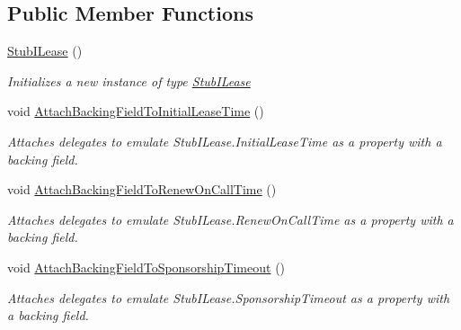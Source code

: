 \subsection*{Public Member Functions}
\begin{DoxyCompactItemize}
\item 
\hyperlink{class_system_1_1_runtime_1_1_remoting_1_1_lifetime_1_1_fakes_1_1_stub_i_lease_ab51313a709c92d6ad2cb9bc30fbbd773}{Stub\-I\-Lease} ()
\begin{DoxyCompactList}\small\item\em Initializes a new instance of type \hyperlink{class_system_1_1_runtime_1_1_remoting_1_1_lifetime_1_1_fakes_1_1_stub_i_lease}{Stub\-I\-Lease}\end{DoxyCompactList}\item 
void \hyperlink{class_system_1_1_runtime_1_1_remoting_1_1_lifetime_1_1_fakes_1_1_stub_i_lease_ac3ad3182223c12fefa1b8d4d90082a0f}{Attach\-Backing\-Field\-To\-Initial\-Lease\-Time} ()
\begin{DoxyCompactList}\small\item\em Attaches delegates to emulate Stub\-I\-Lease.\-Initial\-Lease\-Time as a property with a backing field.\end{DoxyCompactList}\item 
void \hyperlink{class_system_1_1_runtime_1_1_remoting_1_1_lifetime_1_1_fakes_1_1_stub_i_lease_aa53ba22cfa421cd83be6966f1f2819b4}{Attach\-Backing\-Field\-To\-Renew\-On\-Call\-Time} ()
\begin{DoxyCompactList}\small\item\em Attaches delegates to emulate Stub\-I\-Lease.\-Renew\-On\-Call\-Time as a property with a backing field.\end{DoxyCompactList}\item 
void \hyperlink{class_system_1_1_runtime_1_1_remoting_1_1_lifetime_1_1_fakes_1_1_stub_i_lease_ac2ab63611c9db19283c5a8c0ecc39049}{Attach\-Backing\-Field\-To\-Sponsorship\-Timeout} ()
\begin{DoxyCompactList}\small\item\em Attaches delegates to emulate Stub\-I\-Lease.\-Sponsorship\-Timeout as a property with a backing field.\end{DoxyCompactList}\end{DoxyCompactItemize}
